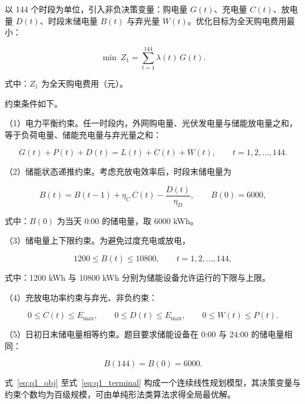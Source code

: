 以 144 个时段为单位，引入非负决策变量：购电量 $G(t)$、充电量 $C(t)$、放电量 $D(t)$、时段末储电量 $B(t)$ 与弃光量 $W(t)$。优化目标为全天购电费用最小：

\begin{equation}
  \min\ Z_1 = \sum_{t=1}^{144} \lambda(t)\,G(t).
  \label{eq:q1_obj}
\end{equation}

式中：$Z_1$ 为全天购电费用（元）。

约束条件如下。

（1）电力平衡约束。任一时段内，外网购电量、光伏发电量与储能放电量之和，等于负荷电量、储能充电量与弃光量之和：

\begin{equation}
  G(t) + P(t) + D(t) = L(t) + C(t) + W(t), \qquad t = 1,2,\dots,144.
  \label{eq:q1_balance}
\end{equation}

（2）储能状态递推约束。考虑充放电效率后，时段末储电量为

\begin{equation}
  B(t) = B(t-1) + \eta_C\,C(t) - \frac{D(t)}{\eta_D}, \qquad B(0) = 6000,
  \label{eq:q1_soc}
\end{equation}

式中：$B(0)$ 为当天 0:00 的储电量，取 6000 kWh。

（3）储电量上下限约束。为避免过度充电或放电，

\begin{equation}
  1200 \le B(t) \le 10800, \qquad t = 1,2,\dots,144,
  \label{eq:q1_socbound}
\end{equation}

式中：1200 kWh 与 10800 kWh 分别为储能设备允许运行的下限与上限。

（4）充放电功率约束与弃光、非负约束：

\begin{equation}
  0 \le C(t) \le E_{\max}, \qquad 0 \le D(t) \le E_{\max}, \qquad 0 \le W(t) \le P(t).
  \label{eq:q1_power}
\end{equation}

（5）日初日末储电量相等约束。题目要求储能设备在 0:00 与 24:00 的储电量相同：

\begin{equation}
  B(144) = B(0) = 6000.
  \label{eq:q1_terminal}
\end{equation}

式~\eqref{eq:q1_obj} 至式~\eqref{eq:q1_terminal} 构成一个连续线性规划模型，其决策变量与约束个数均为百级规模，可由单纯形法类算法求得全局最优解\cite{ref1,ref2}。


